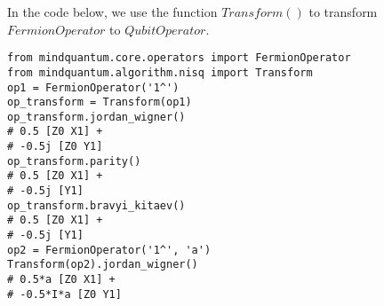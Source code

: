 In the code below, we use the function $Transform()$ to transform $FermionOperator$ to $QubitOperator$.
\begin{lstlisting}
from mindquantum.core.operators import FermionOperator
from mindquantum.algorithm.nisq import Transform
op1 = FermionOperator('1^')
op_transform = Transform(op1)
op_transform.jordan_wigner()
# 0.5 [Z0 X1] +
# -0.5j [Z0 Y1]
op_transform.parity()
# 0.5 [Z0 X1] +
# -0.5j [Y1]
op_transform.bravyi_kitaev()
# 0.5 [Z0 X1] +
# -0.5j [Y1]
op2 = FermionOperator('1^', 'a')
Transform(op2).jordan_wigner()
# 0.5*a [Z0 X1] +
# -0.5*I*a [Z0 Y1]
\end{lstlisting}